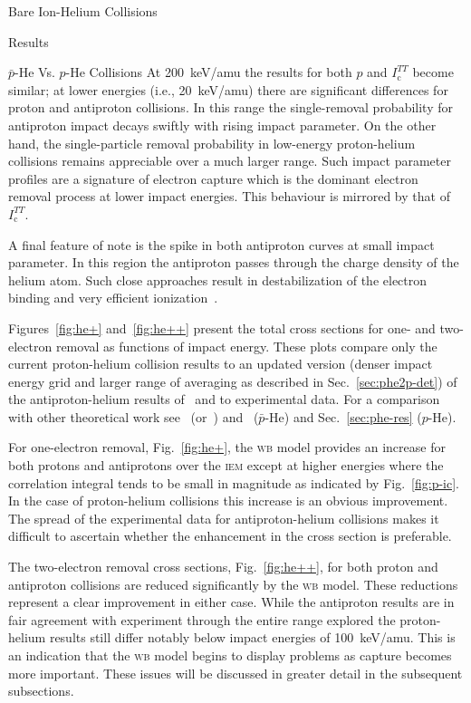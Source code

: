 \documentclass[a5paper, 9 pt]{extreport}
\begin{document}
\begin{chapter}{Bare Ion-Helium Collisions \label{chap:p-he2p-he}}
\begin{section}{Results \label{sec:phe2p-res}}
\begin{subsection}{ \texorpdfstring{$\bar{p}$}{pbar}-He Vs. \texorpdfstring{$p$}{p}-He Collisions
                         \label{sec:pbarhe-res}}
         At 200~keV/amu the results for both $p$ and $I^{TT}_\mathrm{c}$ become similar; at lower
         energies (i.e., 20~keV/amu) there are significant differences for proton and antiproton
         collisions. In this range the single-removal probability for antiproton impact decays swiftly
         with rising impact parameter. On the other hand, the single-particle removal probability in
         low-energy proton-helium collisions remains appreciable over a much larger range. Such impact
         parameter profiles are a signature of electron capture which is the dominant electron removal
         process at lower impact energies. This behaviour is mirrored by that of $I^{TT}_\mathrm{c}$.

         A final feature of note is the spike in both antiproton curves at small impact parameter. In
         this region the antiproton passes through the charge density of the helium atom. Such close
         approaches result in destabilization of the electron binding and very efficient
         ionization~\cite{pbarhe-rev}.

         Figures~\ref{fig:he+} and~\ref{fig:he++} present the total cross sections for one- and
         two-electron removal as functions of impact energy. These plots compare only the current
         proton-helium collision results to an updated version (denser impact energy grid and larger
         range of averaging as described in Sec.~\ref{sec:phe2p-det}) of the antiproton-helium results
         of~\cite{pbarhe} and to experimental data. For a comparison with other theoretical work
         see~\cite{thesis} (or~\cite{pbarhe}) and~\cite{new-pbarhe} ($\bar{p}$-He) and
         Sec.~\ref{sec:phe-res} ($p$-He).

         For one-electron removal, Fig.~\ref{fig:he+}, the \textsc{wb} model provides an increase for
         both protons and antiprotons over the \textsc{iem} except at higher energies where the
         correlation integral tends to be small in magnitude as indicated by Fig.~\ref{fig:p-ic}. In the
         case of proton-helium collisions this increase is an obvious improvement. The spread of the
         experimental data for antiproton-helium collisions makes it difficult to ascertain whether the
         enhancement in the cross section is preferable.

         The two-electron removal cross sections, Fig.~\ref{fig:he++}, for both proton and antiproton
         collisions are reduced significantly by the \textsc{wb} model. These reductions represent a
         clear improvement in either case. While the antiproton results are in fair agreement with
         experiment through the entire range explored the proton-helium results still differ notably
         below impact energies of 100~keV/amu. This is an indication that the \textsc{wb} model begins
         to display problems as capture becomes more important. These issues will be discussed in
         greater detail in the subsequent subsections.


\end{subsection}
\end{section}
\end{chapter}
\end{document}
